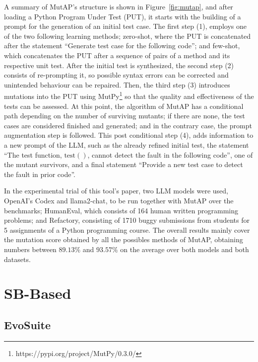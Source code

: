 \documentclass[%
  chapterprefix=false,%
  open=right,%
  twoside=true,%
  paper=a4,%
  logofile={Figures/logo.png},%
  thesistype=master,%
  UKenglish,%
]{se2thesis}
\begin{document}
A summary of MutAP's structure is shown in Figure~\ref{fig:mutap}, and after loading a Python Program Under Test (PUT), it starts with the building of a prompt for the generation of an initial test case.
The first step (1), employs one of the two following learning methods; zero-shot, where the PUT is concatenated after the statement  ``Generate test case for the following code''; and few-shot, which concatenates the PUT after a sequence of pairs of a method and its respective unit test.
After the initial test is synthesized, the second step (2) consists of re-prompting it, so possible syntax errors can be corrected and unintended behaviour can be repaired.
Then, the third step (3) introduces mutations into the PUT using MutPy\footnote{https://pypi.org/project/MutPy/0.3.0/} so that the quality and effectiveness of the tests can be assessed.
At this point, the algorithm of MutAP has a conditional path depending on the number of surviving mutants; if there are none, the test cases are considered finished and generated; and in the contrary case, the prompt augmentation step is followed.
This post conditional step (4), adds information to a new prompt of the LLM, such as the already refined initial test, the statement ``The test function, \(\text{test}()\), cannot detect the fault in the
following code'', one of the mutant survivors, and a final statement ``Provide a new test case to detect the fault in prior code''.

In the experimental trial of this tool's paper, two LLM models were used, OpenAI's Codex and llama2-chat, to be run together with MutAP over the benchmarks; HumanEval, which consists of 164 human written programming problems; and Refactory, consisting of 1710 buggy submissions from students for 5 assignments of a Python programming course.
The overall results mainly cover the mutation score obtained by all the possibles methods of MutAP, obtaining numbers between \(89.13\%\) and \(93.57\%\) on the average over both models and both datasets.

\section{SB-Based}

\subsection*{EvoSuite}
\end{document}
